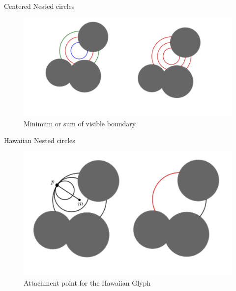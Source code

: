 \documentclass{beamer}
\begin{document}
\begin{frame}{Centered Nested circles}
  
  \begin{figure}[h]
    \centering
      \includegraphics[width=0.9\linewidth]{assets/nested_utility}
      \caption{Minimum or sum of visible boundary}
  \end{figure}
\end{frame}

\begin{frame}{Hawaiian Nested circles}
  
  \begin{figure}[h]
    \centering
      \includegraphics[width=0.9\linewidth]{assets/hawaiian_utility.png}
      \caption{Attachment point for the Hawaiian Glyph}
  \end{figure}
  
\end{frame}
\end{document}
